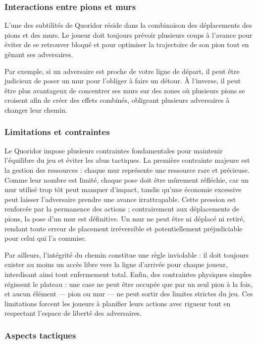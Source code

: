 \documentclass[a4paper]{article}
\begin{document}
\subsubsection{Interactions entre pions et murs}

L’une des subtilités de Quoridor réside dans la combinaison des déplacements des pions et des murs. Le joueur doit toujours prévoir plusieurs coups à l’avance pour éviter de se retrouver bloqué et pour optimiser la trajectoire de son pion tout en gênant ses adversaires.

Par exemple, si un adversaire est proche de votre ligne de départ, il peut être judicieux de poser un mur pour l’obliger à faire un détour. À l’inverse, il peut être plus avantageux de concentrer ses murs sur des zones où plusieurs pions se croisent afin de créer des effets combinés, obligeant plusieurs adversaires à changer leur chemin.

\subsubsection{Limitations et contraintes}

Le Quoridor impose plusieurs contraintes fondamentales pour maintenir l’équilibre du jeu et éviter les abus tactiques. La première contrainte majeure est la gestion des ressources : chaque mur représente une ressource rare et précieuse. Comme leur nombre est limité, chaque pose doit être mûrement réfléchie, car un mur utilisé trop tôt peut manquer d'impact, tandis qu'une économie excessive peut laisser l'adversaire prendre une avance irrattrapable. Cette pression est renforcée par la permanence des actions ; contrairement aux déplacements de pions, la pose d'un mur est définitive. Un mur ne peut être ni déplacé ni retiré, rendant toute erreur de placement irréversible et potentiellement préjudiciable pour celui qui l'a commise.

Par ailleurs, l'intégrité du chemin constitue une règle inviolable : il doit toujours exister au moins un accès libre vers la ligne d’arrivée pour chaque joueur, interdisant ainsi tout enfermement total. Enfin, des contraintes physiques simples régissent le plateau : une case ne peut être occupée que par un seul pion à la fois, et aucun élément — pion ou mur — ne peut sortir des limites strictes du jeu. Ces limitations forcent les joueurs à planifier leurs actions avec rigueur tout en respectant l'espace de liberté des adversaires.

\subsubsection{Aspects tactiques}
\end{document}
